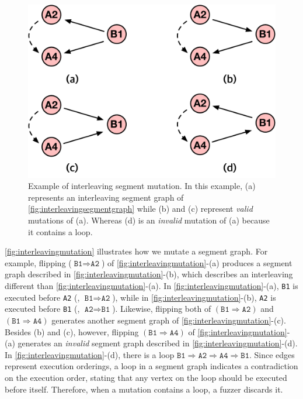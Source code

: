 \begin{figure}[t]
  \centering
  \includegraphics[width=0.7\linewidth]{fig/interleavingmutation.pdf}
  \caption{Example of interleaving segment mutation. In this example,
    (a) represents an interleaving segment graph of
    \autoref{fig:interleavingsegmentgraph} while (b) and (c) represent
    \textit{valid} mutations of (a). Whereas (d) is an
    \textit{invalid} mutation of (a) because it contains a loop.}
  \label{fig:interleavingmutation}
\end{figure}
%
\autoref{fig:interleavingmutation} illustrates how we mutate a segment
graph.
%
For example, flipping ($\texttt{B1} \Rightarrow \texttt{A2}$) of
\autoref{fig:interleavingmutation}-(a) produces a segment graph
described in \autoref{fig:interleavingmutation}-(b), which describes
an interleaving different than \autoref{fig:interleavingmutation}-(a).
%
In \autoref{fig:interleavingmutation}-(a), \texttt{B1} is executed
before \texttt{A2} (\ie, $\texttt{B1} \Rightarrow \texttt{A2}$), while
in \autoref{fig:interleavingmutation}-(b), \texttt{A2} is executed
before \texttt{B1} (\ie, $\texttt{A2} \Rightarrow \texttt{B1}$).
%
Likewise, flipping both of $(\texttt{B1} \Rightarrow \texttt{A2})$ and
$(\texttt{B1} \Rightarrow \texttt{A4})$ generates another segment
graph of \autoref{fig:interleavingmutation}-(c).
%
Besides (b) and (c), however, flipping
$(\texttt{B1} \Rightarrow \texttt{A4})$ of
\autoref{fig:interleavingmutation}-(a) generates an \textit{invalid}
segment graph described in \autoref{fig:interleavingmutation}-(d).
%
In \autoref{fig:interleavingmutation}-(d), there is a loop
$\texttt{B1} \Rightarrow \texttt{A2} \Rightarrow \texttt{A4}
\Rightarrow \texttt{B1}$.
%
Since edges represent execution orderings, a loop in a segment graph
indicates a contradiction on the execution order, stating that any
vertex on the loop should be executed before itself. Therefore, when a
mutation contains a loop, a fuzzer discards it.
%


